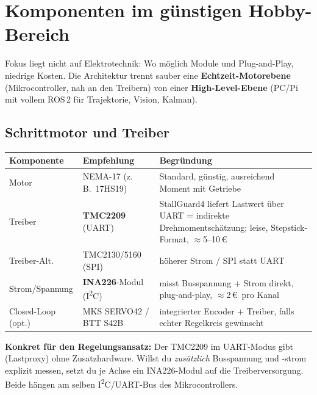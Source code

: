 
\chapter{Komponenten im günstigen Hobby-Bereich}

\begin{infobox}[title=Leitprinzip]
Fokus liegt nicht auf Elektrotechnik: Wo möglich Module und Plug-and-Play,
niedrige Kosten. Die Architektur trennt sauber eine
\textbf{Echtzeit-Motorebene} (Mikrocontroller, nah an den Treibern) von einer
\textbf{High-Level-Ebene} (PC/Pi mit vollem ROS\,2 für Trajektorie, Vision,
Kalman).
\end{infobox}

\section{Schrittmotor und Treiber}
\begin{longtable}{@{}p{3.6cm}p{4.2cm}p{7.2cm}@{}}
\toprule
\textbf{Komponente} & \textbf{Empfehlung} & \textbf{Begründung} \\
\midrule
Motor          & NEMA-17 (z.\,B.\ 17HS19) & Standard, günstig, ausreichend Moment mit Getriebe \\
Treiber        & \textbf{TMC2209} (UART)   & StallGuard4 liefert Lastwert über UART = indirekte Drehmomentschätzung; leise, Stepstick-Format, $\approx$5--10\,\euro \\
Treiber-Alt.   & TMC2130/5160 (SPI)       & höherer Strom / SPI statt UART \\
Strom/Spannung & \textbf{INA226}-Modul (I\textsuperscript{2}C) & misst Busspannung + Strom direkt, plug-and-play, $\approx$2\,\euro\ pro Kanal \\
Closed-Loop (opt.) & MKS SERVO42 / BTT S42B & integrierter Encoder + Treiber, falls echter Regelkreis gewünscht \\
\bottomrule
\end{longtable}

\noindent\textbf{Konkret für den Regelungsansatz:} Der TMC2209 im UART-Modus
gibt  (Lastproxy) ohne Zusatzhardware. Willst du
\emph{zusätzlich} Busspannung und -strom explizit messen, setzt du je Achse ein
INA226-Modul auf die Treiberversorgung. Beide hängen am selben I\textsuperscript{2}C/UART-Bus
des Mikrocontrollers.

